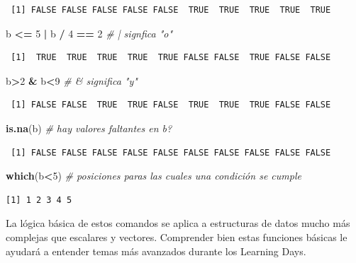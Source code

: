 \documentclass[12pt,spanish,]{book}
\newenvironment{Shaded}{\begin{snugshade}}{\end{snugshade}}
\newcommand{\CommentTok}[1]{\textcolor[rgb]{0.56,0.35,0.01}{\textit{#1}}}
\newcommand{\DecValTok}[1]{\textcolor[rgb]{0.00,0.00,0.81}{#1}}
\newcommand{\KeywordTok}[1]{\textcolor[rgb]{0.13,0.29,0.53}{\textbf{#1}}}
\newcommand{\NormalTok}[1]{#1}
\newcommand{\OperatorTok}[1]{\textcolor[rgb]{0.81,0.36,0.00}{\textbf{#1}}}
\newcommand{\StringTok}[1]{\textcolor[rgb]{0.31,0.60,0.02}{#1}}
\begin{document}
\begin{verbatim}
 [1] FALSE FALSE FALSE FALSE FALSE  TRUE  TRUE  TRUE  TRUE  TRUE
\end{verbatim}

\begin{Shaded}
\begin{Highlighting}[]
\NormalTok{b }\OperatorTok{<=}\StringTok{ }\DecValTok{5} \OperatorTok{|}\StringTok{ }\NormalTok{b }\OperatorTok{/}\StringTok{ }\DecValTok{4} \OperatorTok{==}\StringTok{ }\DecValTok{2}        \CommentTok{# | signfica "o"}
\end{Highlighting}
\end{Shaded}

\begin{verbatim}
 [1]  TRUE  TRUE  TRUE  TRUE  TRUE FALSE FALSE  TRUE FALSE FALSE
\end{verbatim}

\begin{Shaded}
\begin{Highlighting}[]
\NormalTok{b}\OperatorTok{>}\DecValTok{2} \OperatorTok{&}\StringTok{ }\NormalTok{b}\OperatorTok{<}\DecValTok{9}                  \CommentTok{# & significa "y"}
\end{Highlighting}
\end{Shaded}

\begin{verbatim}
 [1] FALSE FALSE  TRUE  TRUE FALSE  TRUE  TRUE  TRUE FALSE FALSE
\end{verbatim}

\begin{Shaded}
\begin{Highlighting}[]
\KeywordTok{is.na}\NormalTok{(b)                   }\CommentTok{# hay valores faltantes en b?}
\end{Highlighting}
\end{Shaded}

\begin{verbatim}
 [1] FALSE FALSE FALSE FALSE FALSE FALSE FALSE FALSE FALSE FALSE
\end{verbatim}

\begin{Shaded}
\begin{Highlighting}[]
\KeywordTok{which}\NormalTok{(b}\OperatorTok{<}\DecValTok{5}\NormalTok{)       }\CommentTok{# posiciones paras las cuales una condición se cumple}
\end{Highlighting}
\end{Shaded}

\begin{verbatim}
[1] 1 2 3 4 5
\end{verbatim}

La lógica básica de estos comandos se aplica a estructuras de datos mucho más complejas que escalares y vectores. Comprender bien estas funciones básicas le ayudará a entender temas más avanzados durante los Learning Days.

\hypertarget{refs}{}

\printbibliography
\end{document}
